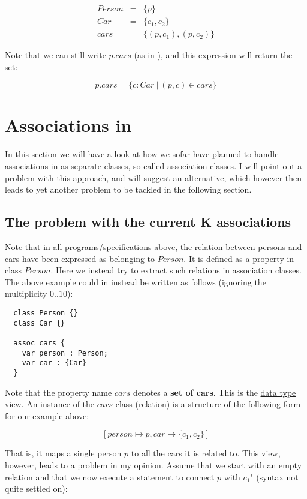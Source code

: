 \documentclass{llncs}
\begin{document}
\begin{eqnarray}
Person &=& \{p\}\\
Car &=& \{c_1,c_2\}\\
cars &=& \{(p,c_1),(p,c_2)\}
\end{eqnarray}

\noindent
Note that we can still write $p.cars$ (as in \ocl), and this expression will return the set:

\[
p.cars = \{c : Car\ |\ (p,c) \in cars \}
\]

\section{Associations in \klang}
\label{sec:associations}

In this section we will have a look at how we sofar have planned to 
handle associations in \klang{} as separate classes, so-called association
classes. I will point out a problem with this approach, and will suggest an
alternative, which however then leads to yet another problem to be tackled in the following section.

\subsection{The problem with the current K associations}

Note that in all programs/specifications above,  
the relation between persons and cars have 
been expressed as belonging to $Person$. It is 
defined as a property in class $Person$. Here we instead try to extract such relations in association classes. The above example could 
in \klang{} instead be written as follows (ignoring the multiplicity $0..10$):

\sk
\begin{lstlisting}
  class Person {}
  class Car {}

  assoc cars {
    var person : Person;
    var car : {Car}
  }
\end{lstlisting}

\noindent
Note that the property name $cars$ denotes a {\bf set of cars}. This is
the \underline{data type view}. An instance of the $cars$ class 
(relation) is a structure of the following form for our example above:

\[
[person \mapsto p, car \mapsto \{c_1,c_2\}]
\]

\noindent
That is, it maps a single person $p$ to all the cars it is related to.
This view, however, leads to a problem in my opinion. Assume that we start with an empty relation and that we now execute a statement to connect $p$
with $c_1$" (syntax not quite settled on):
\end{document}
